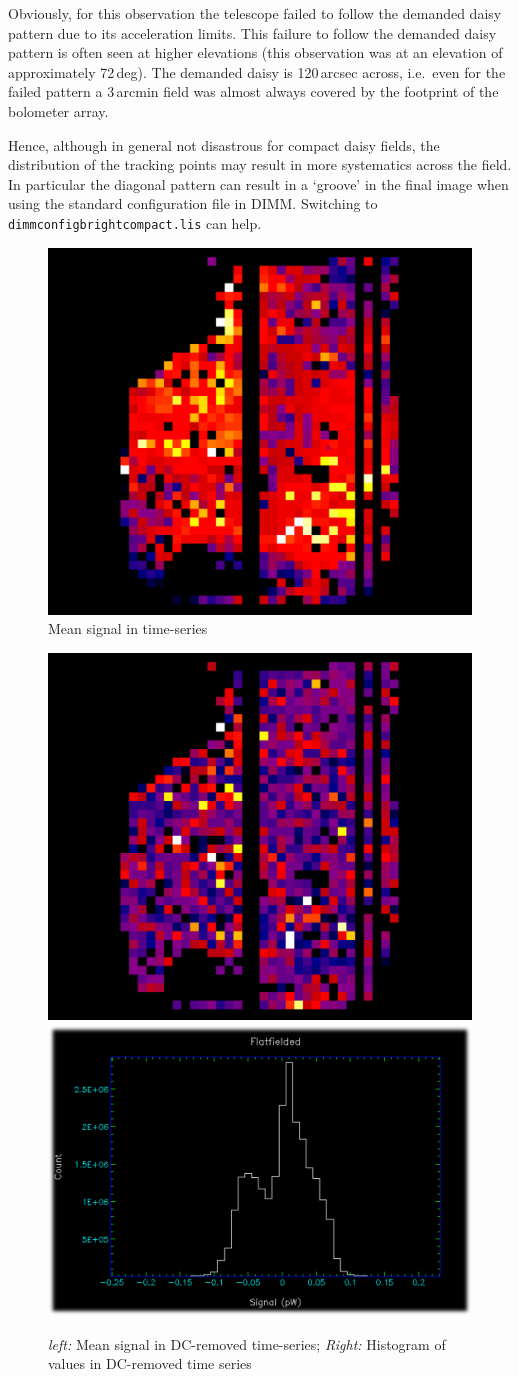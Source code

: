 \documentclass[twoside,11pt]{article}
\renewcommand{\_}{\texttt{\symbol{95}}}
\begin{document}
Obviously, for this observation the telescope failed to follow the
demanded daisy pattern due to its acceleration limits. This failure to
follow the demanded daisy pattern is often seen at higher elevations
(this observation was at an elevation of approximately 72\,deg). The
demanded daisy is 120\,arcsec across, i.e.\ even for the failed
pattern a 3\,arcmin field was almost always covered by the footprint
of the bolometer array.

Hence, although in general not disastrous for compact daisy fields,
the distribution of the tracking points may result in more systematics
across the field. In particular the diagonal pattern can result in a
`groove' in the final image when using the standard configuration file
in DIMM. Switching to \texttt{dimmconfig\_bright\_compact.lis}
can help.

\begin{figure}
\begin{center}
\includegraphics[width=0.45\linewidth]{sc19_con_collapse}
\caption{Mean signal in time-series }
\label{fig:concollapse}
\end{center}
\end{figure}

\begin{figure}
\begin{center}
\includegraphics[width=0.45\linewidth]{sc19_conbsl_collapse}
\hspace{0.03\linewidth}
\includegraphics[width=0.45\linewidth]{sc19_bsl_histogram}
\caption{\textsl{left:} Mean signal in DC-removed time-series;
         \textsl{Right:} Histogram of values in DC-removed time series }
\label{fig:conbslcollapse}
\end{center}
\end{figure}
\end{document}
